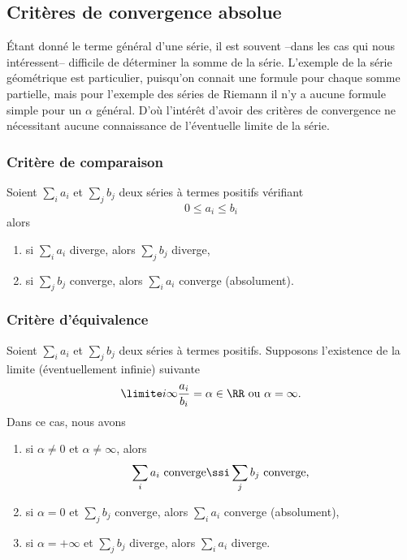 \subsection{Critères de convergence absolue}

  Étant donné le terme général d'une série, il est souvent --dans les cas qui nous intéressent-- difficile de déterminer la somme de la série. L'exemple de la série géométrique est particulier, puisqu'on connait une formule pour chaque somme partielle, mais pour l'exemple des séries de Riemann il n'y a aucune formule simple pour un $\alpha$ général. D'où l'intérêt d'avoir des critères de convergence ne nécessitant aucune connaissance de l'éventuelle limite de la série.

\subsubsection{Critère de comparaison} 

\begin{lemma}   \label{LemgHWyfG}
Soient $\sum_i a_i$ et $\sum_j
b_j$ deux séries à termes positifs vérifiant
\begin{equation*}
  0 \leq a_i \leq b_i
\end{equation*}
alors
\begin{enumerate}
\item si $\sum_i a_i$ diverge, alors $\sum_j b_j$ diverge,
\item si $\sum_j b_j$ converge, alors $\sum_i a_i$ converge
  (absolument).
  \end{enumerate}
\end{lemma}

\subsubsection{Critère d'équivalence}

\begin{proposition}
 Soient $\sum_i a_i$ et $\sum_j b_j$ deux séries à termes positifs. Supposons l'existence de la limite (éventuellement infinie) suivante
\begin{equation}
  \limite i \infty \frac{a_i}{b_i} = \alpha \in \RR \text{ ou $\alpha =
    \infty$.}
\end{equation}
Dans ce cas, nous avons
\begin{enumerate}
\item si $\alpha \neq 0$ et $\alpha\neq \infty$, alors
  \begin{equation}
    \sum_i a_i \text{~converge} \ssi \sum_j b_j\text{~converge,}
  \end{equation}
\item si $\alpha = 0$ et $\sum_j b_j$ converge, alors $\sum_i a_i$
  converge (absolument),
\item si $\alpha = +\infty$ et $\sum_j b_j$ diverge, alors $\sum_i
  a_i$ diverge.
\end{enumerate}
\end{proposition}

